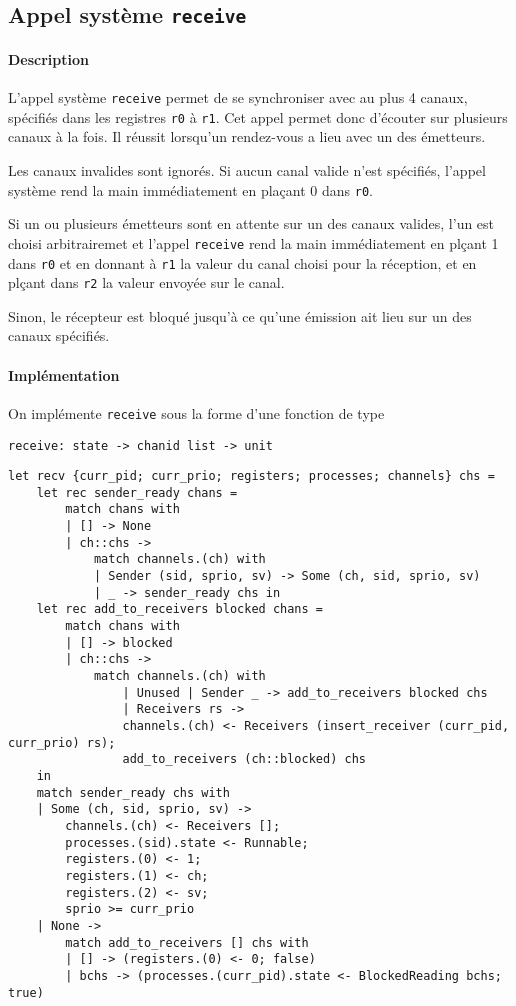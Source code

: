 \documentclass[french, toc]{../cs-classes/cs-classes}
\begin{document}
\subsection{Appel système \texttt{receive}}
\paragraph*{Description}
L'appel système \texttt{receive} permet de se synchroniser avec au plus 4 canaux, spécifiés dans les registres \texttt{r0} à \texttt{r1}. Cet appel permet donc d'écouter sur plusieurs canaux à la fois. Il réussit lorsqu'un rendez-vous a lieu avec un des émetteurs. 

Les canaux invalides sont ignorés. Si aucun canal valide n'est spécifiés, l'appel système rend la main immédiatement en plaçant 0 dans \texttt{r0}.

Si un ou plusieurs émetteurs sont en attente sur un des canaux valides, l'un est choisi arbitrairemet et l'appel \texttt{receive} rend la main immédiatement en plçant 1 dans \texttt{r0} et en donnant à \texttt{r1} la valeur du canal choisi pour la réception, et en plçant dans \texttt{r2} la valeur envoyée sur le canal.

Sinon, le récepteur est bloqué jusqu'à ce qu'une émission ait lieu sur un des canaux spécifiés.

\paragraph*{Implémentation} On implémente \texttt{receive} sous la forme d'une fonction de type
\begin{center}
    \texttt{receive: state -> chanid list -> unit}
\end{center}

\begin{verbatim}
let recv {curr_pid; curr_prio; registers; processes; channels} chs =
    let rec sender_ready chans =
        match chans with
        | [] -> None
        | ch::chs ->
            match channels.(ch) with
            | Sender (sid, sprio, sv) -> Some (ch, sid, sprio, sv)
            | _ -> sender_ready chs in
    let rec add_to_receivers blocked chans =
        match chans with
        | [] -> blocked
        | ch::chs ->
            match channels.(ch) with
                | Unused | Sender _ -> add_to_receivers blocked chs
                | Receivers rs ->
                channels.(ch) <- Receivers (insert_receiver (curr_pid, curr_prio) rs);
                add_to_receivers (ch::blocked) chs
    in 
    match sender_ready chs with
    | Some (ch, sid, sprio, sv) ->
        channels.(ch) <- Receivers [];
        processes.(sid).state <- Runnable;
        registers.(0) <- 1;
        registers.(1) <- ch;
        registers.(2) <- sv;
        sprio >= curr_prio
    | None ->
        match add_to_receivers [] chs with
        | [] -> (registers.(0) <- 0; false)
        | bchs -> (processes.(curr_pid).state <- BlockedReading bchs; true)
\end{verbatim}
\end{document}
